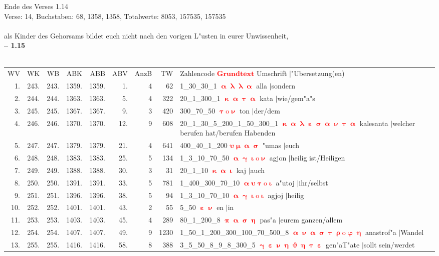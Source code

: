 \documentclass[a4paper,10pt,landscape]{article}
\begin{document}
Ende des Verses 1.14\\
Verse: 14, Buchstaben: 68, 1358, 1358, Totalwerte: 8053, 157535, 157535\\
\\
als Kinder des Gehorsams bildet euch nicht nach den vorigen L"usten in eurer Unwissenheit,\\
\newpage 
{\bf -- 1.15}\\
\medskip \\
\begin{tabular}{rrrrrrrrp{120mm}}
WV&WK&WB&ABK&ABB&ABV&AnzB&TW&Zahlencode \textcolor{red}{$\boldsymbol{Grundtext}$} Umschrift $|$"Ubersetzung(en)\\
1.&243.&243.&1359.&1359.&1.&4&62&1\_30\_30\_1 \textcolor{red}{$\boldsymbol{\upalpha\uplambda\uplambda\upalpha}$} alla $|$sondern\\
2.&244.&244.&1363.&1363.&5.&4&322&20\_1\_300\_1 \textcolor{red}{$\boldsymbol{\upkappa\upalpha\uptau\upalpha}$} kata $|$wie/gem"a"s\\
3.&245.&245.&1367.&1367.&9.&3&420&300\_70\_50 \textcolor{red}{$\boldsymbol{\uptau\mathrm{o}\upnu}$} ton $|$der/dem\\
4.&246.&246.&1370.&1370.&12.&9&608&20\_1\_30\_5\_200\_1\_50\_300\_1 \textcolor{red}{$\boldsymbol{\upkappa\upalpha\uplambda\upepsilon\upsigma\upalpha\upnu\uptau\upalpha}$} kalesanta $|$welcher berufen hat/berufen Habenden\\
5.&247.&247.&1379.&1379.&21.&4&641&400\_40\_1\_200 \textcolor{red}{$\boldsymbol{\upsilon\upmu\upalpha\upsigma}$} "umas $|$euch\\
6.&248.&248.&1383.&1383.&25.&5&134&1\_3\_10\_70\_50 \textcolor{red}{$\boldsymbol{\upalpha\upgamma\upiota\mathrm{o}\upnu}$} agjon $|$heilig ist/Heiligen\\
7.&249.&249.&1388.&1388.&30.&3&31&20\_1\_10 \textcolor{red}{$\boldsymbol{\upkappa\upalpha\upiota}$} kaj $|$auch\\
8.&250.&250.&1391.&1391.&33.&5&781&1\_400\_300\_70\_10 \textcolor{red}{$\boldsymbol{\upalpha\upsilon\uptau\mathrm{o}\upiota}$} a"utoj $|$ihr/selbst\\
9.&251.&251.&1396.&1396.&38.&5&94&1\_3\_10\_70\_10 \textcolor{red}{$\boldsymbol{\upalpha\upgamma\upiota\mathrm{o}\upiota}$} agjoj $|$heilig\\
10.&252.&252.&1401.&1401.&43.&2&55&5\_50 \textcolor{red}{$\boldsymbol{\upepsilon\upnu}$} en $|$in\\
11.&253.&253.&1403.&1403.&45.&4&289&80\_1\_200\_8 \textcolor{red}{$\boldsymbol{\uppi\upalpha\upsigma\upeta}$} pas"a $|$eurem ganzen/allem\\
12.&254.&254.&1407.&1407.&49.&9&1230&1\_50\_1\_200\_300\_100\_70\_500\_8 \textcolor{red}{$\boldsymbol{\upalpha\upnu\upalpha\upsigma\uptau\uprho\mathrm{o}\upvarphi\upeta}$} anastrof"a $|$Wandel\\
13.&255.&255.&1416.&1416.&58.&8&388&3\_5\_50\_8\_9\_8\_300\_5 \textcolor{red}{$\boldsymbol{\upgamma\upepsilon\upnu\upeta\upvartheta\upeta\uptau\upepsilon}$} gen"aT"ate $|$sollt sein/werdet\\
\end{tabular}\medskip \\
\end{document}
